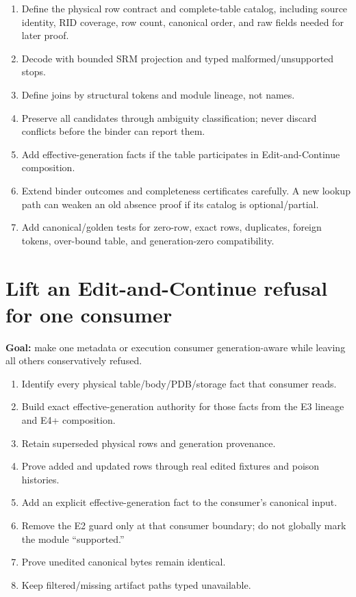 \documentclass[11pt,oneside,openany]{book}
\begin{document}
\begin{enumerate}
  \item Define the physical row contract and complete-table catalog, including source identity, RID coverage, row count, canonical order, and raw fields needed for later proof.
  \item Decode with bounded SRM projection and typed malformed/unsupported stops.
  \item Define joins by structural tokens and module lineage, not names.
  \item Preserve all candidates through ambiguity classification; never discard conflicts before the binder can report them.
  \item Add effective-generation facts if the table participates in Edit-and-Continue composition.
  \item Extend binder outcomes and completeness certificates carefully. A new lookup path can weaken an old absence proof if its catalog is optional/partial.
  \item Add canonical/golden tests for zero-row, exact rows, duplicates, foreign tokens, over-bound table, and generation-zero compatibility.
\end{enumerate}

\section{Lift an Edit-and-Continue refusal for one consumer}

\begin{recipebox}
\textbf{Goal:} make one metadata or execution consumer generation-aware while leaving all others conservatively refused.
\end{recipebox}

\begin{enumerate}
  \item Identify every physical table/body/PDB/storage fact that consumer reads.
  \item Build exact effective-generation authority for those facts from the E3 lineage and E4+ composition.
  \item Retain superseded physical rows and generation provenance.
  \item Prove added and updated rows through real edited fixtures and poison histories.
  \item Add an explicit effective-generation fact to the consumer's canonical input.
  \item Remove the E2 guard only at that consumer boundary; do not globally mark the module ``supported.''
  \item Prove unedited canonical bytes remain identical.
  \item Keep filtered/missing artifact paths typed unavailable.
\end{enumerate}
\end{document}
